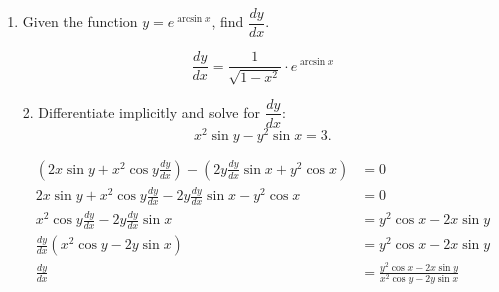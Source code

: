 \documentclass[11pt]{article}
\begin{document}
\pagestyle{empty}
\newsavebox{\quizfront}
\begin{lrbox}{\quizfront}
\begin{minipage}[top][4.5in][t]{\textwidth} \setlength{\parindent}{1.5em}
\drawtitle
\vspace{-0.5in}
\begin{enumerate}

\item Given the function $\displaystyle y = e^{\arcsin{x}}$, find $\dfrac{dy}{dx}$.

\vfill
{\color{blue}
  \[
  \frac{dy}{dx} = \frac{1}{\sqrt{1-x^2}}\cdot e^{\arcsin{x}}
  \]
}
\vfill
\end{enumerate}




\end{minipage}
\end{lrbox}

\newsavebox{\quizback}
\begin{lrbox}{\quizback}
\begin{minipage}[top][4.5in][t]{\textwidth} \setlength{\parindent}{1.5em}
\begin{enumerate}
\item[2.] Differentiate implicitly and solve for $\dfrac{dy}{dx}$:
$$ x^2\sin{y} - y^2 \sin{x} = 3.$$

\vfill
{\color{blue}

  \begin{align*}
    \left(2x\sin{y} + x^2\cos{y} \frac{dy}{dx}\right) - \left(2y\frac{dy}{dx}\sin{x} + y^2\cos{x}\right) &= 0\\
    2x\sin{y}+x^2\cos{y}\frac{dy}{dx} - 2y\frac{dy}{dx}\sin{x} - y^2\cos{x} &= 0\\
    x^2\cos{y}\frac{dy}{dx} - 2y\frac{dy}{dx}\sin{x} &= y^2\cos{x} - 2x\sin{y}\\
    \frac{dy}{dx}\left(x^2\cos{y} - 2y\sin{x}\right) &= y^2\cos{x} - 2x\sin{y}\\
    \frac{dy}{dx} &= \frac{y^2\cos{x} - 2x\sin{y}}{x^2\cos{y} - 2y\sin{x}}
  \end{align*}

}
\vfill

\end{enumerate}
\end{minipage}
\end{lrbox}

\noindent \usebox{\quizfront}
\vfill
\noindent \usebox{\quizback}

\end{document}
